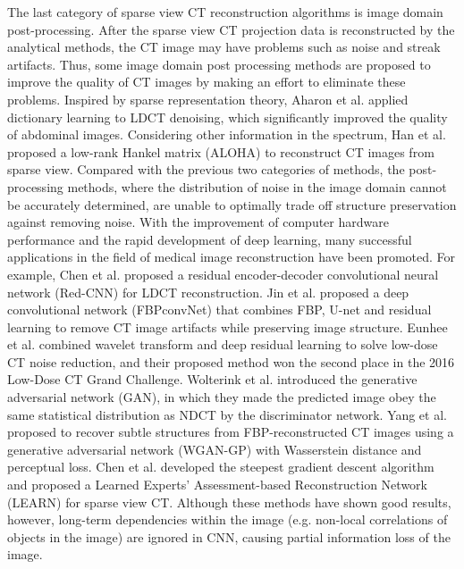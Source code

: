 \documentclass[lettersize,journal]{IEEEtran}
\begin{document}
The last category of sparse view CT reconstruction algorithms is image domain post-processing. After the sparse view CT projection data is reconstructed by the analytical methods, the CT image may have problems such as noise and streak artifacts. Thus, some image domain post processing methods are proposed to improve the quality of CT images by making an effort to eliminate these problems. Inspired by sparse representation theory, Aharon et al. applied dictionary learning\cite{2006ksvd} to LDCT denoising, which significantly improved the quality of abdominal images. Considering other information in the spectrum, Han\cite{2016Sparse} et al. proposed a low-rank Hankel matrix (ALOHA) to reconstruct CT images from sparse view. Compared with the previous two categories of methods, the post-processing methods, where the distribution of noise in the image domain cannot be accurately determined, are unable to optimally trade off structure preservation against removing noise. With the improvement of computer hardware performance and the rapid development of deep learning, many successful applications in the field of medical image reconstruction have been promoted. For example, Chen et al. proposed a residual encoder-decoder convolutional neural network (Red-CNN)\cite{redcnn} for LDCT reconstruction. Jin et al. \cite{2016FBPConvNet} proposed a deep convolutional network (FBPconvNet) that combines FBP, U-net and residual learning to remove CT image artifacts while preserving image structure. Eunhee et al. \cite{8332971} combined wavelet transform and deep residual learning to solve low-dose CT noise reduction, and their proposed method won the second place in the 2016 Low-Dose CT Grand Challenge. Wolterink et al. \cite{2017Generative} introduced the generative adversarial network (GAN), in which they made the predicted image obey the same statistical distribution as NDCT by the discriminator network. Yang et al. \cite{2018Low} proposed to recover subtle structures from FBP-reconstructed CT images using a generative adversarial network (WGAN-GP) with Wasserstein distance and perceptual loss. Chen et al. \cite{2018LEARN} developed the steepest gradient descent algorithm and proposed a Learned Experts' Assessment-based Reconstruction Network (LEARN) for sparse view CT. Although these methods have shown good results, however, long-term dependencies within the image (e.g. non-local correlations of objects in the image) are ignored in CNN, causing partial information loss of the image.
\end{document}
